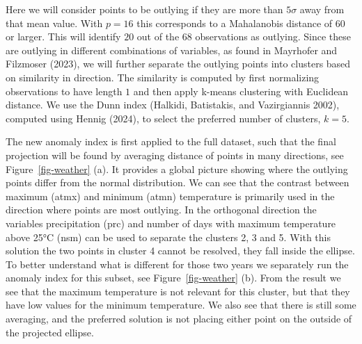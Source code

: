 \documentclass[
  12pt,
]{interact}
\begin{document}
Here we will consider points to be outlying if they are more than
\(5 \sigma\) away from that mean value. With \(p=16\) this corresponds
to a Mahalanobis distance of \(60\) or larger. This will identify \(20\)
out of the \(68\) observations as outlying. Since these are outlying in
different combinations of variables, as found in Mayrhofer and Filzmoser
(2023), we will further separate the outlying points into clusters based
on similarity in direction. The similarity is computed by first
normalizing observations to have length \(1\) and then apply k-means
clustering with Euclidean distance. We use the Dunn index (Halkidi,
Batistakis, and Vazirgiannis 2002), computed using Hennig (2024), to
select the preferred number of clusters, \(k=5\).

The new anomaly index is first applied to the full dataset, such that
the final projection will be found by averaging distance of points in
many directions, see Figure~\ref{fig-weather} (a). It provides a global
picture showing where the outlying points differ from the normal
distribution. We can see that the contrast between maximum (atmx) and
minimum (atmn) temperature is primarily used in the direction where
points are most outlying. In the orthogonal direction the variables
precipitation (prc) and number of days with maximum temperature above
25°C (nsm) can be used to separate the clusters 2, 3 and 5. With this
solution the two points in cluster 4 cannot be resolved, they fall
inside the ellipse. To better understand what is different for those two
years we separately run the anomaly index for this subset, see
Figure~\ref{fig-weather} (b). From the result we see that the maximum
temperature is not relevant for this cluster, but that they have low
values for the minimum temperature. We also see that there is still some
averaging, and the preferred solution is not placing either point on the
outside of the projected ellipse.
\end{document}
